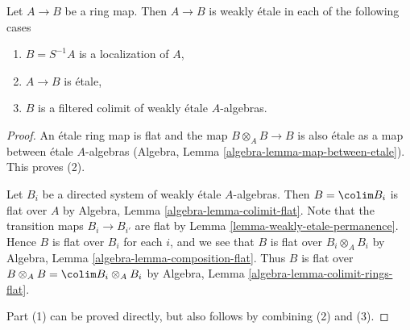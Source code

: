 \begin{lemma}
\label{lemma-when-weakly-etale}
Let $A \to B$ be a ring map. Then $A \to B$ is weakly \'etale in each
of the following cases
\begin{enumerate}
\item $B = S^{-1}A$ is a localization of $A$,
\item $A \to B$ is \'etale,
\item $B$ is a filtered colimit of weakly \'etale $A$-algebras.
\end{enumerate}
\end{lemma}

\begin{proof}
An \'etale ring map is flat and the map $B \otimes_A B \to B$ is
also \'etale as a map between \'etale $A$-algebras
(Algebra, Lemma \ref{algebra-lemma-map-between-etale}).
This proves (2).

\medskip\noindent
Let $B_i$ be a directed system of weakly \'etale $A$-algebras.
Then $B = \colim B_i$ is flat over $A$ by
Algebra, Lemma \ref{algebra-lemma-colimit-flat}.
Note that the transition maps $B_i \to B_{i'}$ are flat
by Lemma \ref{lemma-weakly-etale-permanence}.
Hence $B$ is flat over $B_i$ for each $i$, and we see that $B$ is flat
over $B_i \otimes_A B_i$ by
Algebra, Lemma \ref{algebra-lemma-composition-flat}.
Thus $B$ is flat over $B \otimes_A B = \colim B_i \otimes_A B_i$
by Algebra, Lemma \ref{algebra-lemma-colimit-rings-flat}.

\medskip\noindent
Part (1) can be proved directly, but also follows by combining
(2) and (3).
\end{proof}
